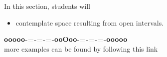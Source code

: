 \documentclass{ximera}
\begin{document}
\begin{sectionOutcomes}
In this section, students will 

\begin{itemize}
\item contemplate space resulting from open intervals.
\end{itemize}
\end{sectionOutcomes}













\begin{center}
\textbf{\textcolor{green!50!black}{ooooo-=-=-=-ooOoo-=-=-=-ooooo}} \\

more examples can be found by following this link\\ 

\end{center}
\end{document}
